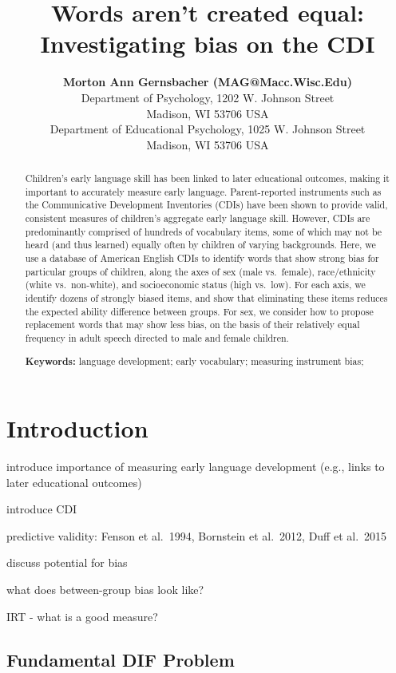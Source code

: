 \documentclass[10pt, letterpaper]{article}
\title{Words aren't created equal: Investigating bias on the CDI}
\author{{\large \bf Morton Ann Gernsbacher (MAG@Macc.Wisc.Edu)} \\ Department of Psychology, 1202 W. Johnson Street \\ Madison, WI 53706 USA \AND {\large \bf Sharon J.~Derry (SDJ@Macc.Wisc.Edu)} \\ Department of Educational Psychology, 1025 W. Johnson Street \\ Madison, WI 53706 USA}
\begin{document}
\maketitle

\begin{abstract}
Children's early language skill has been linked to later educational
outcomes, making it important to accurately measure early language.
Parent-reported instruments such as the Communicative Development
Inventories (CDIs) have been shown to provide valid, consistent measures
of children's aggregate early language skill. However, CDIs are
predominantly comprised of hundreds of vocabulary items, some of which
may not be heard (and thus learned) equally often by children of varying
backgrounds. Here, we use a database of American English CDIs to
identify words that show strong bias for particular groups of children,
along the axes of sex (male vs.~female), race/ethnicity (white
vs.~non-white), and socioeconomic status (high vs.~low). For each axis,
we identify dozens of strongly biased items, and show that eliminating
these items reduces the expected ability difference between groups. For
sex, we consider how to propose replacement words that may show less
bias, on the basis of their relatively equal frequency in adult speech
directed to male and female children.

\textbf{Keywords:}
language development; early vocabulary; measuring instrument bias;
\end{abstract}

\hypertarget{introduction}{%
\section{Introduction}\label{introduction}}

introduce importance of measuring early language development (e.g.,
links to later educational outcomes)

introduce CDI

predictive validity: Fenson et al.~1994, Bornstein et al.~2012, Duff et
al.~2015

discuss potential for bias

what does between-group bias look like?

IRT - what is a good measure?

\hypertarget{fundamental-dif-problem}{%
\subsection{Fundamental DIF Problem}\label{fundamental-dif-problem}}
\end{document}
